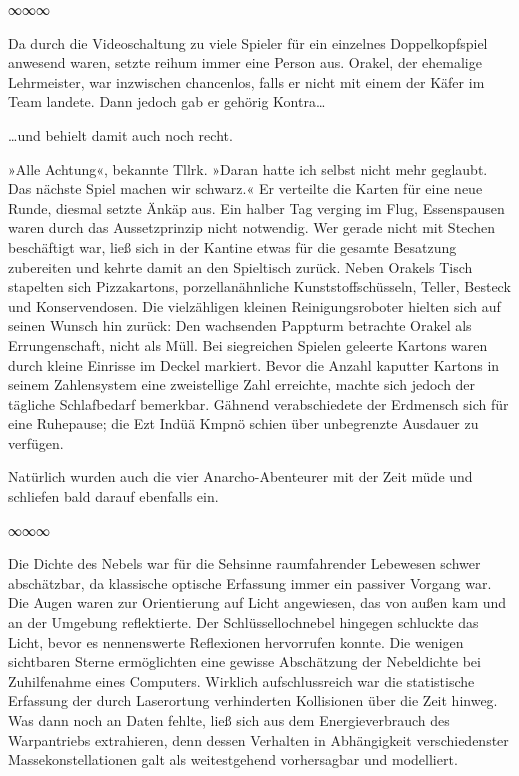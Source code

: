 \begin{center}
∞∞∞
\end{center}

Da durch die Videoschaltung zu viele Spieler für ein einzelnes Doppelkopfspiel anwesend waren, setzte reihum immer eine Person aus. Orakel, der ehemalige Lehrmeister, war inzwischen chancenlos, falls er nicht mit einem der Käfer im Team landete. Dann jedoch gab er gehörig Kontra…


…und behielt damit auch noch recht.

»Alle Achtung«, bekannte Tllrk. »Daran hatte ich selbst nicht mehr geglaubt. Das nächste Spiel machen wir schwarz.« Er verteilte die Karten für eine neue Runde, diesmal setzte Änkäp aus. Ein halber Tag verging im Flug, Essenspausen waren durch das Aussetzprinzip nicht notwendig. Wer gerade nicht mit Stechen beschäftigt war, ließ sich in der Kantine etwas für die gesamte Besatzung zubereiten und kehrte damit an den Spieltisch zurück. Neben Orakels Tisch stapelten sich Pizzakartons, porzellanähnliche Kunststoffschüsseln, Teller, Besteck und Konservendosen. Die vielzähligen kleinen Reinigungsroboter hielten sich auf seinen Wunsch hin zurück: Den wachsenden Pappturm betrachte Orakel als Errungenschaft, nicht als Müll. Bei siegreichen Spielen geleerte Kartons waren durch kleine Einrisse im Deckel markiert. Bevor die Anzahl kaputter Kartons in seinem Zahlensystem eine zweistellige Zahl erreichte, machte sich jedoch der tägliche Schlafbedarf bemerkbar. Gähnend verabschiedete der Erdmensch sich für eine Ruhepause; die Ezt Indüä Kmpnö schien über unbegrenzte Ausdauer zu verfügen.

Natürlich wurden auch die vier Anarcho-Abenteurer mit der Zeit müde und schliefen bald darauf ebenfalls ein.

\begin{center}
∞∞∞
\end{center}

Die Dichte des Nebels war für die Sehsinne raumfahrender Lebewesen schwer abschätzbar, da klassische optische Erfassung immer ein passiver Vorgang war. Die Augen waren zur Orientierung auf Licht angewiesen, das von außen kam und an der Umgebung reflektierte. Der Schlüssellochnebel hingegen schluckte das Licht, bevor es nennenswerte Reflexionen hervorrufen konnte. Die wenigen sichtbaren Sterne ermöglichten eine gewisse Abschätzung der Nebeldichte bei Zuhilfenahme eines Computers. Wirklich aufschlussreich war die statistische Erfassung der durch Laserortung verhinderten Kollisionen über die Zeit hinweg. Was dann noch an Daten fehlte, ließ sich aus dem Energieverbrauch des Warpantriebs extrahieren, denn dessen Verhalten in Abhängigkeit verschiedenster Massekonstellationen galt als weitestgehend vorhersagbar und modelliert.

